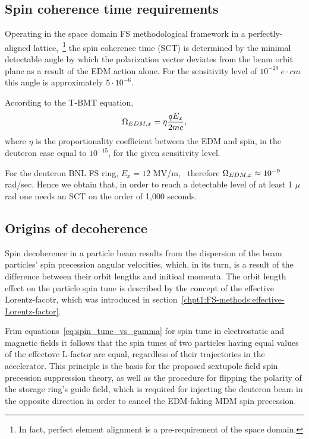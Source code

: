 

\subsection{Spin coherence time requirements}
Operating in the space domain FS methodological framework in a perfectly-aligned lattice,~\footnote{In fact,
perfect element alignment is a pre-requirement of the space domain.}
the spin coherence time (SCT) is determined by the minimal detectable angle
by which the polarization vector deviates from the beam orbit plane as a result of the EDM action
alone. For the sensitivity level of $10^{-29}~e\cdot cm$ this angle is approximately
$5\cdot10^{-6}$.~\cite{BNL:Deuteron2008}

According to the T-BMT equation,
\[
\Omega_{EDM,x} = \eta\frac{qE_x}{2mc},
\]
where $\eta$ is the proportionality coefficient between the EDM and spin,
in the deuteron case equal to $10^{-15}$, for the given sensitivity level.~\cite[p.~206]{Eremey:Thesis}

For the deuteron BNL FS ring, $E_x = 12$
MV/m,~\cite[p.~19]{BNL:Deuteron2008} therefore $\Omega_{EDM,x}\approx 10^{-9}$ rad/sec.
Hence we obtain that, in order to reach a detectable level of at least 1 $\mu$rad one needs an SCT
on the order of 1,000 seconds.~\cite[p.~207]{Eremey:Thesis}
\subsection{Origins of decoherence}\label{sec:decoh:origin}
Spin decoherence in a particle beam results from the dispersion of the beam particles'
spin precession angular velocities, which, in its turn, is a result of the difference
between their orbit lengths and initioal momenta. The orbit length effect on the particle spin tune
is described by the concept of the effective Lorentz-facotr, which was introduced
in section~\ref{chpt1:FS-methods:effective-Lorentz-factor}.

Frim equations~\eqref{eq:spin_tune_vs_gamma} for spin tune in electrostatic and magnetic fields it follows that 
the spin tunes of two particles having equal values of the effectove L-factor are equal, regardless of
their trajectories in the accelerator. This principle is the basis for the proposed sextupole field
spin precession suppression theory, as well as the procedure for flipping the polarity of the storage ring's
guide field, which is required for injecting the deuteron beam in the opposite direction in order to cancel
the EDM-faking MDM spin precession.

